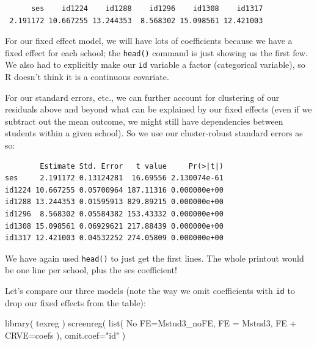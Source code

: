 \documentclass[
  letterpaper,
  DIV=11,
  numbers=noendperiod]{scrreprt}
\newenvironment{Shaded}{\begin{snugshade}}{\end{snugshade}}
\newcommand{\AttributeTok}[1]{\textcolor[rgb]{0.49,0.56,0.16}{#1}}
\newcommand{\FunctionTok}[1]{\textcolor[rgb]{0.02,0.16,0.49}{#1}}
\newcommand{\NormalTok}[1]{\textcolor[rgb]{0.00,0.44,0.13}{#1}}
\newcommand{\OtherTok}[1]{\textcolor[rgb]{0.00,0.44,0.13}{#1}}
\newcommand{\SpecialCharTok}[1]{\textcolor[rgb]{0.25,0.44,0.63}{#1}}
\newcommand{\StringTok}[1]{\textcolor[rgb]{0.25,0.44,0.63}{#1}}
\begin{document}
\begin{verbatim}
      ses    id1224    id1288    id1296    id1308    id1317 
 2.191172 10.667255 13.244353  8.568302 15.098561 12.421003 
\end{verbatim}

For our fixed effect model, we will have lots of coefficients because we
have a fixed effect for each school; the \texttt{head()} command is just
showing us the first few. We also had to explicitly make our \texttt{id}
variable a factor (categorical variable), so R doesn't think it is a
continuous covariate.

For our standard errors, etc., we can further account for clustering of
our residuals above and beyond what can be explained by our fixed
effects (even if we subtract out the mean outcome, we might still have
dependencies between students within a given school). So we use our
cluster-robust standard errors as so:

\begin{Shaded}
\end{Shaded}

\begin{verbatim}
        Estimate Std. Error   t value     Pr(>|t|)
ses     2.191172 0.13124281  16.69556 2.130074e-61
id1224 10.667255 0.05700964 187.11316 0.000000e+00
id1288 13.244353 0.01595913 829.89215 0.000000e+00
id1296  8.568302 0.05584382 153.43332 0.000000e+00
id1308 15.098561 0.06929621 217.88439 0.000000e+00
id1317 12.421003 0.04532252 274.05809 0.000000e+00
\end{verbatim}

We have again used \texttt{head()} to just get the first lines. The
whole printout would be one line per school, plus the ses coefficient!

Let's compare our three models (note the way we omit coefficients with
\texttt{id} to drop our fixed effects from the table):

\begin{Shaded}
\begin{Highlighting}[]
\FunctionTok{library}\NormalTok{( texreg )}
\FunctionTok{screenreg}\NormalTok{( }\FunctionTok{list}\NormalTok{( }\StringTok{\textasciigrave{}}\AttributeTok{No FE}\StringTok{\textasciigrave{}}\OtherTok{=}\NormalTok{Mstud3\_noFE, }\StringTok{\textasciigrave{}}\AttributeTok{FE}\StringTok{\textasciigrave{}} \OtherTok{=}\NormalTok{ Mstud3, }\StringTok{\textasciigrave{}}\AttributeTok{FE + CRVE}\StringTok{\textasciigrave{}}\OtherTok{=}\NormalTok{coefs ), }
           \AttributeTok{omit.coef=}\StringTok{"id"}\NormalTok{ )}
\end{Highlighting}
\end{Shaded}
\end{document}
